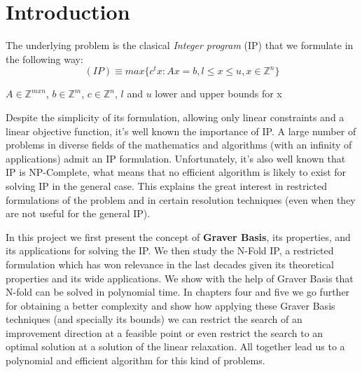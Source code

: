 \chapter{Introduction} \label{introduction}


The underlying problem is the clasical \textit{Integer program} (IP) that we formulate in the following way:
\begin{equation*}
    (IP) \equiv max\{c^tx : Ax = b, l \leq x \leq u, x \in \mathbb{Z}^n \}
\end{equation*}
\vspace{-50pt}
\begin{center}
$A \in \mathbb{Z}^{mxn}$, $b \in \mathbb{Z}^m$, $c \in \mathbb{Z}^n$, $l$  and $u$ lower and upper bounds for x
\end{center}


Despite the simplicity of its formulation, allowing only linear constraints and a linear objective function, it's well known the importance of IP. A large number of problems in diverse fields of the mathematics and algorithms (with an infinity of applications) admit an IP formulation. Unfortunately, it's also well known that IP is NP-Complete, what means that no efficient algorithm is likely to exist for solving IP in the general case. This explains the great interest in restricted formulations of the problem and in certain resolution techniques (even when they are not useful for the general IP). %

In this project we first present the concept of \textbf{Graver Basis}, its properties, and its applications for solving the IP. We then study the N-Fold IP, a restricted formulation which has won relevance in the last decades given its theoretical properties and its wide applications. We show with the help of Graver Basis that N-fold can be solved in polynomial time. In chapters four and five we go further for obtaining a better complexity and show how applying these Graver Basis techniques (and specially its bounds) we can restrict the search of an improvement direction at a feasible point or even restrict the search to an optimal solution at a solution of the linear relaxation. All together lead us to a polynomial and efficient algorithm for this kind of problems.


%








